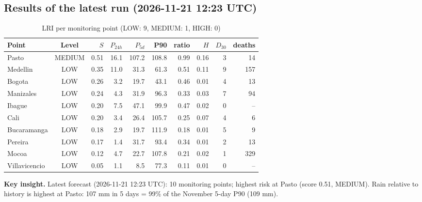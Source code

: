 \documentclass[11pt,a4paper]{article}
\begin{document}
\subsection{Results of the latest run (2026-11-21 12:23 UTC)}
\begin{table}[H]\centering\small
\caption{LRI per monitoring point (LOW: 9, MEDIUM: 1, HIGH: 0)}
\begin{tabular}{lcrrrrrrrr}\toprule
Point & Level & $S$ & $P_{24h}$ & $P_{5d}$ & P90 & ratio & $H$ & $D_{30}$ & deaths\\\midrule
Pasto & MEDIUM & 0.51 & 16.1 & 107.2 & 108.8 & 0.99 & 0.16 & 3 & 14 \\
Medellin & LOW & 0.35 & 11.0 & 31.3 & 61.3 & 0.51 & 0.11 & 9 & 157 \\
Bogota & LOW & 0.26 & 3.2 & 19.7 & 43.1 & 0.46 & 0.01 & 4 & 13 \\
Manizales & LOW & 0.24 & 4.3 & 31.9 & 96.3 & 0.33 & 0.03 & 7 & 94 \\
Ibague & LOW & 0.20 & 7.5 & 47.1 & 99.9 & 0.47 & 0.02 & 0 & -- \\
Cali & LOW & 0.20 & 3.4 & 26.4 & 105.7 & 0.25 & 0.07 & 4 & 6 \\
Bucaramanga & LOW & 0.18 & 2.9 & 19.7 & 111.9 & 0.18 & 0.01 & 5 & 9 \\
Pereira & LOW & 0.17 & 1.4 & 31.7 & 93.4 & 0.34 & 0.01 & 2 & 13 \\
Mocoa & LOW & 0.12 & 4.7 & 22.7 & 107.8 & 0.21 & 0.02 & 1 & 329 \\
Villavicencio & LOW & 0.05 & 1.1 & 8.5 & 77.3 & 0.11 & 0.01 & 0 & -- \\
\bottomrule\end{tabular}\end{table}
\noindent\textbf{Key insight.} Latest forecast (2026-11-21 12:23 UTC): 10 monitoring points; highest risk at Pasto (score 0.51, MEDIUM). Rain relative to history is highest at Pasto: 107 mm in 5 days = 99\% of the November 5-day P90 (109 mm).
\end{document}
